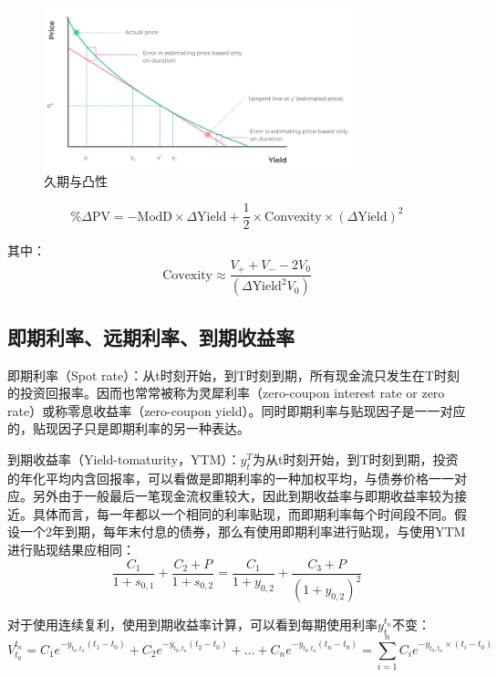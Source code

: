 \documentclass[11pt]{article}
\begin{document}
\begin{figure}[H]
    \centering
    \includegraphics[width=0.8\textwidth]{fig/duration-convexity.png}
    \caption{久期与凸性}
    \label{fig:duration-convexity}
\end{figure}

\begin{equation*}
    \%\Delta\text{PV} = -\text{ModD} \times \Delta\text{Yield} + \frac{1}{2} \times \text{Convexity} \times (\Delta\text{Yield})^2
\end{equation*}

其中：
\begin{equation*}
    \text{Covexity} \approx \frac{V_{+}+V_{-}-2 V_0}{(\Delta\text{Yield}^2 V_0)}
\end{equation*}


\subsection{即期利率、远期利率、到期收益率}

即期利率（Spot rate）：从t时刻开始，到T时刻到期，所有现金流只发生在T时刻的投资回报率。因而也常常被称为灵犀利率（zero-coupon interest rate or zero rate）或称零息收益率（zero-coupon yield）。同时即期利率与贴现因子是一一对应的，贴现因子只是即期利率的另一种表达。

到期收益率（Yield-tomaturity，YTM）：$y_t^T$为从t时刻开始，到T时刻到期，投资的年化平均内含回报率，可以看做是即期利率的一种加权平均，与债券价格一一对应。另外由于一般最后一笔现金流权重较大，因此到期收益率与即期收益率较为接近。具体而言，每一年都以一个相同的利率贴现，而即期利率每个时间段不同。假设一个2年到期，每年末付息的债券，那么有使用即期利率进行贴现，与使用YTM进行贴现结果应相同：
\begin{equation*}
    \frac{C_1}{1+s_{0,1}} +\frac{C_2+P}{1+s_{0,2}} = 
    \frac{C_1}{1+y_{0,2}} +\frac{C_3+P}{(1+y_{0,2})^2}
\end{equation*}

对于使用连续复利，使用到期收益率计算，可以看到每期使用利率$y_t^{t_n}$不变：
\begin{equation*}
    V_{t_0}^{t_n} = C_1 e^{-y_{t_0,t_n}(t_1-t_0)} + C_2 e^{-y_{t_0,t_n}(t_2-t_0)}
    + \dots + C_n e^{-y_{t_0,t_n}(t_n-t_0)}
    = \sum_{i=1}^{n} C_i e^{-y_{t_0,t_n}\times (t_i-t_0)}
\end{equation*}
\end{document}
